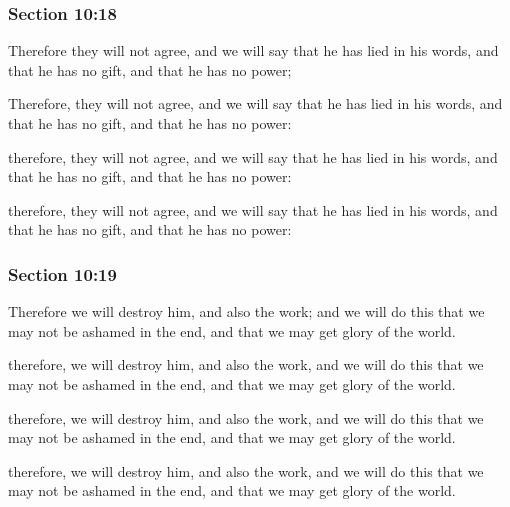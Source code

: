	\subsubsection{Section 10:18} %
		\label{DC10-18}

		Therefore they will not agree, and we will say that he has lied in his words, and that he has no gift, and that he has no power;

		\begin{framed}
		\scriptsize
			\begin{compactdesc}
				\item[JSP] Therefore, they will not agree, and we will say that he has lied in his words, and that he has no gift, and that he has no power:
				\item[RB1] [\textit{missing}] 
				\item[DC 1835] therefore, they will not agree, and we will say that he has lied in his words, and that he has no gift, and that he has no power:
				\item[DC 1844] therefore, they will not agree, and we will say that he has lied in his words, and that he has no gift, and that he has no power: 
			\end{compactdesc}
		\end{framed}

	\subsubsection{Section 10:19} %
		\label{DC10-19}

		Therefore we will destroy him, and also the work; and we will do this that we may not be ashamed in the end, and that we may get glory of the world.

		\begin{framed}
		\scriptsize
			\begin{compactdesc}
				\item[JSP] therefore, we will destroy him, and also the work, and we will do this that we may not be ashamed in the end, and that we may get glory of the world.
				\item[RB1] [\textit{missing}] 
				\item[DC 1835] therefore, we will destroy him, and also the work, and we will do this that we may not be ashamed in the end, and that we may get glory of the world.
				\item[DC 1844] therefore, we will destroy him, and also the work, and we will do this that we may not be ashamed in the end, and that we may get glory of the world.
			\end{compactdesc}
		\end{framed}


